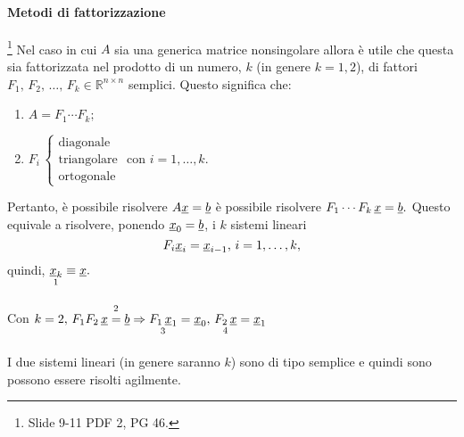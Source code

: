 \paragraph{Metodi di fattorizzazione}\footnote{Slide 9-11 PDF 2, PG 46.} Nel caso in cui $A$ sia una generica matrice \gls{nonsingolare} allora è utile che questa sia fattorizzata nel prodotto di un numero, $k$ (in genere $k=1,2$), di fattori $F_1,\, F_2,\,\hdots,\, F_k\in\mathbb R^{n\times n}$ semplici. Questo significa che:
\begin{enumerate}
    \item $A=F_1\cdots F_k;$
    \item $F_i\,\begin{cases}
        \text{diagonale}\\
        \text{triangolare}\\
        \text{ortogonale}
    \end{cases}$ con $i=1,\hdots, k.$
\end{enumerate}

Pertanto, è possibile risolvere $A\uline x=\uline b$  è possibile risolvere $F_1 \cdots F_k \, \uline x=\uline b.$ Questo equivale a risolvere, ponendo $\uline x_0=\uline b$, i $k$ sistemi lineari
\begin{equation*}
 F_i \uline x_i = \uline x_{i-1},\, i=1,\hdots, k,
\end{equation*}
quindi, $\underset{\footnotemark}{\uline x_k}\equiv \uline x.$ 

\begin{example}
    Con $k=2,\, F_1 F_2 \, \uline x\overset{\footnotemark}{=}\uline b\Rightarrow\underset{\footnotemark}{F_1\, \uline x_1} = \uline x_0,\, \underset{\footnotemark}{F_2\, \uline x} = \uline x_1$
\end{example}

\addtocounter{footnote}{-2}



I due sistemi lineari (in genere saranno $k$) sono di tipo semplice e quindi sono possono essere risolti agilmente.

